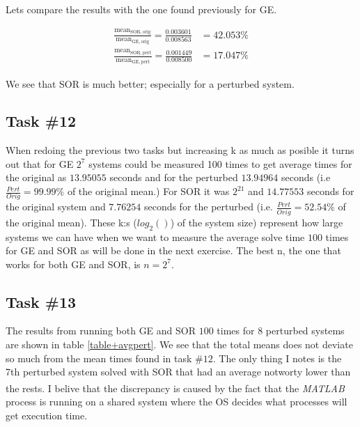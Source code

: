\documentclass[10pt, a4paper]{article}
\newcommand{\matlab}{\small{\emph{MATLAB\textsuperscript{\textregistered}}}}
\begin{document}
Lets compare the results with the one found previously for GE.

\begin{eqnarray}
	\frac{\mathrm{mean}_{\mathrm{SOR, orig}}}{\mathrm{mean}_{\mathrm{GE, orig}}}=\frac{0.003601}{0.008563} & =42.053\% \\
	\frac{\mathrm{mean}_{\mathrm{SOR, pert}}}{\mathrm{mean}_{\mathrm{GE, pert}}}=\frac{0.001449}{0.008500} & =17.047\% \label{math+quota1}
\end{eqnarray}

We see that SOR is much better; especially for a perturbed system.

\subsection{Task \#12}
When redoing the previous two tasks but increasing k as much as posible it turns out that for GE $2^7$ systems could be measured 100 times to get average times for the original as $13.95055$ seconds and for the perturbed $13.94964$ seconds (i.e $\frac{Pert}{Orig}=99.99\%$ of the original mean.) For SOR it was $2^{21}$ and $14.77553$ seconds for the original system and $7.76254$ seconds for the perturbed (i.e. $\frac{Pert}{Orig}=52.54\%$ of the original mean). These k:s ($log_2()$) of the system size) represent how large systems we can have when we want to measure the average solve time $100$ times for GE and SOR as will be done in the next exercise. The best n, the one that works for both GE and SOR, is $n=2^7$.

\subsection{Task \#13}
The results from running both GE and SOR $100$ times for $8$ perturbed systems are shown in table \ref{table+avgpert}. We see that the total means does not deviate so much from the mean times found in task $\#12$. The only thing I notes is the 7th perturbed system solved with SOR that had an average notworty lower than the rests. I belive that the discrepancy is caused by the fact that the \matlab{} process is running on a shared system where the OS decides what processes will get execution time.
\end{document}
